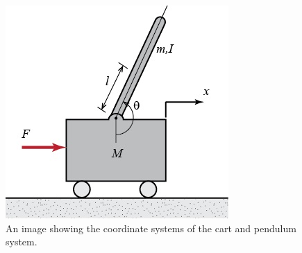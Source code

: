 \documentclass[12 pt]{report}
\begin{document}
\begin{figure}
	\includegraphics[width=\linewidth]{cart-pendulum.jpg}
	\caption{An image showing the coordinate systems of the cart and pendulum system.}
	\label{fig:cart-pendulum}
\end{figure}
\end{document}
